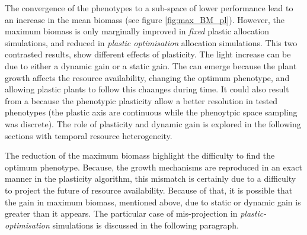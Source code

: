 The convergence of the phenotypes to a sub-space of lower performance lead to an increase in the mean biomass (see figure \ref{fig:max_BM_pl}). However, the maximum biomass is only marginally improved in \textit{fixed} plastic allocation simulations, and reduced in \textit{plastic optimisation} allocation simulations. This two contrasted results, show different effects of plasticity. The light increase can be due to either a dynamic gain or a static gain. The  can emerge because the plant growth affects the resource availability, changing the optimum phenotype, and allowing plastic plants to follow this chaanges during time. It could also result from a  because the phenotypic plasticity allow a better resolution in tested phenotypes (the plastic axis are continuous while the phenoytpic space sampling was discrete). The role of plasticity and dynamic gain is explored in the following sections with temporal resource heterogeneity.

The reduction of the maximum biomass highlight the difficulty to find the optimum phenotype. Because, the growth mechanisms are reproduced in an exact manner in the plasticity algorithm, this mismatch is certainly due to a difficulty to project the future of resource availability. Because of that, it is possible that the gain in maximum biomass, mentioned above, due to static or dynamic gain is greater than it appears. The particular case of mis-projection in \textit{plastic-optimisation} simulations is discussed in the following paragraph. 





